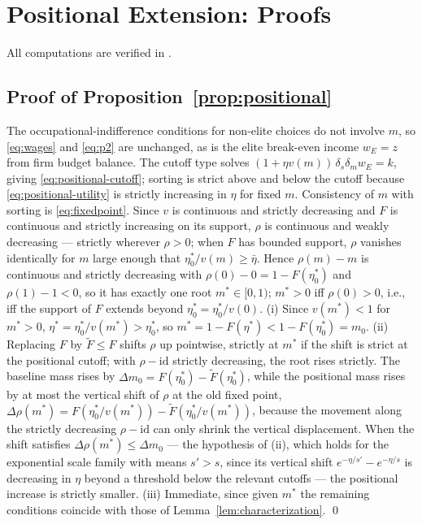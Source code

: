 \documentclass[12pt,letterpaper]{article}
\theoremstyle{definition}
\begin{document}
\section{Positional Extension: Proofs}\label{app:positional}

All computations are verified in .

\subsection{Proof of Proposition~\ref{prop:positional}} The occupational-indifference conditions for non-elite choices do not involve $m$, so \eqref{eq:wages} and \eqref{eq:p2} are unchanged, as is the elite break-even income $w_E=z$ from firm budget balance.
The cutoff type solves $(1+\eta v(m))\,\delta_s\delta_m w_E = k$, giving \eqref{eq:positional-cutoff}; sorting is strict above and below the cutoff because \eqref{eq:positional-utility} is strictly increasing in $\eta$ for fixed $m$.
Consistency of $m$ with sorting is \eqref{eq:fixedpoint}.
Since $v$ is continuous and strictly decreasing and $F$ is continuous and strictly increasing on its support, $\rho$ is continuous and weakly decreasing --- strictly wherever $\rho>0$; when $F$ has bounded support, $\rho$ vanishes identically for $m$ large enough that $\eta^\ast_0/v(m)\geq\bar\eta$.
Hence $\rho(m)-m$ is continuous and strictly decreasing with $\rho(0)-0=1-F(\eta^\ast_0)$ and $\rho(1)-1<0$, so it has exactly one root $m^\ast\in[0,1)$; $m^\ast>0$ iff $\rho(0)>0$, i.e., iff the support of $F$ extends beyond $\eta^\ast_0=\eta^\ast_0/v(0)$.
(i) Since $v(m^\ast)<1$ for $m^\ast>0$, $\eta^\ast=\eta^\ast_0/v(m^\ast)>\eta^\ast_0$, so $m^\ast=1-F(\eta^\ast)<1-F(\eta^\ast_0)=m_0$.
(ii) Replacing $F$ by $\tilde F\leq F$ shifts $\rho$ up pointwise, strictly at $m^\ast$ if the shift is strict at the positional cutoff; with $\rho-\mathrm{id}$ strictly decreasing, the root rises strictly.
The baseline mass rises by $\Delta m_0 = F(\eta^\ast_0)-\tilde F(\eta^\ast_0)$, while the positional mass rises by at most the vertical shift of $\rho$ at the old fixed point, $\Delta\rho(m^\ast) = F(\eta^\ast_0/v(m^\ast))-\tilde F(\eta^\ast_0/v(m^\ast))$, because the movement along the strictly decreasing $\rho-\mathrm{id}$ can only shrink the vertical displacement.
When the shift satisfies $\Delta\rho(m^\ast)\leq\Delta m_0$ --- the hypothesis of (ii), which holds for the exponential scale family with means $s'>s$, since its vertical shift $e^{-\eta/s'}-e^{-\eta/s}$ is decreasing in $\eta$ beyond a threshold below the relevant cutoffs --- the positional increase is strictly smaller.
(iii) Immediate, since given $m^\ast$ the remaining conditions coincide with those of Lemma~\ref{lem:characterization}.
\qed
\end{document}
